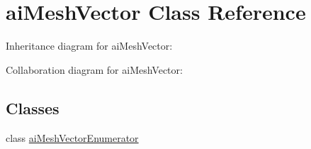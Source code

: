 \hypertarget{classai_mesh_vector}{\section{ai\+Mesh\+Vector Class Reference}
\label{classai_mesh_vector}
}


Inheritance diagram for ai\+Mesh\+Vector\+:


Collaboration diagram for ai\+Mesh\+Vector\+:
\subsection*{Classes}
\begin{DoxyCompactItemize}
\item 
class \hyperlink{classai_mesh_vector_1_1ai_mesh_vector_enumerator}{ai\+Mesh\+Vector\+Enumerator}
\end{DoxyCompactItemize}
